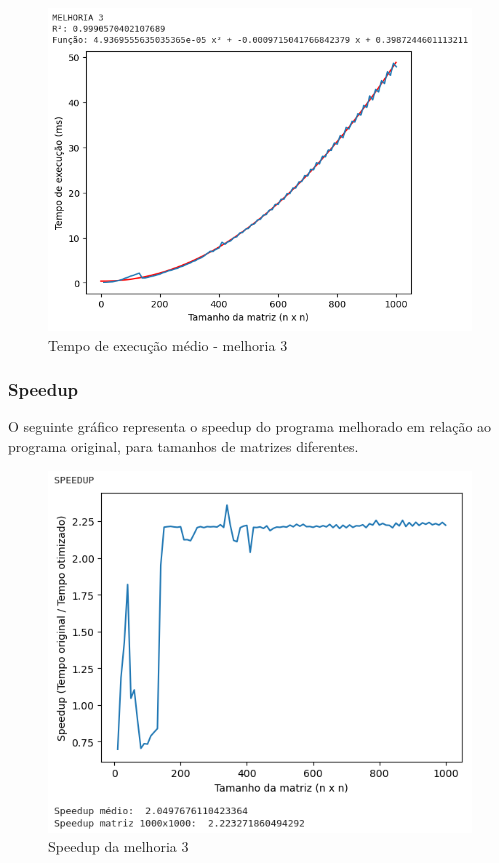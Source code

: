 \begin{figure}[!ht]
	\centering	
	\caption[\hspace{0.1cm}Tempo de execução médio - melhoria 3]{Tempo de execução médio - melhoria 3}
	  \vspace{-0.4cm}
	\includegraphics[width=.8\textwidth]{figuras/melhoria3.png}
\end{figure}

\subsubsection{\esp Speedup}
O seguinte gráfico representa o speedup do programa melhorado em relação ao programa original, para tamanhos de matrizes diferentes.

\begin{figure}[!ht]
	\centering	
	\caption[\hspace{0.1cm}Speedup da melhoria 3]{Speedup da melhoria 3}
	  \vspace{-0.4cm}
	\includegraphics[width=.8\textwidth]{figuras/speedup_melhoria3.png}
\end{figure}

